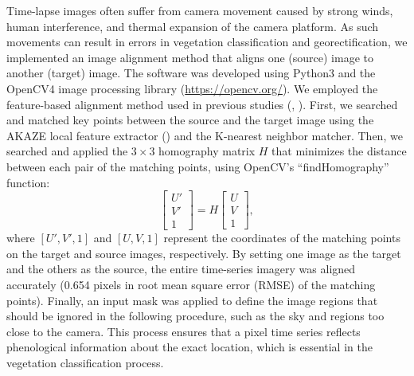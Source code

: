 \documentclass{article}
\begin{document}
Time-lapse images often suffer from camera movement caused by strong winds, human interference, and thermal expansion of the camera platform. As such movements can result in errors in vegetation classification and georectification, we implemented an image alignment method that aligns one (source) image to another (target) image. The software was developed using Python3 and the OpenCV4 image processing library (\url{https://opencv.org/}). We employed the feature-based alignment method used in previous studies (\cite{Hulton2020PyTrx}, \cite{Portenier2020Cryosphere}). First, we searched and matched key points between the source and the target image using the AKAZE local feature extractor (\cite{Alcantarilla2013AKAZE}) and the K-nearest neighbor matcher. Then, we searched and applied the \(3 \times 3\) homography matrix \(H\) that minimizes the distance between each pair of the matching points, using OpenCV's ``findHomography'' function:
\begin{equation}
\label{homography}
  \begin{bmatrix} 
    U' \\ V' \\ 1
  \end{bmatrix}
  =
  H
  \begin{bmatrix}
    U \\ V \\ 1
  \end{bmatrix},
\end{equation}
where \([U', V', 1]\) and \([U, V, 1]\) represent the coordinates of the matching points on the target and source images, respectively. By setting one image as the target and the others as the source, the entire time-series imagery was aligned accurately (0.654 pixels in root mean square error (RMSE) of the matching points). Finally, an input mask was applied to define the image regions that should be ignored in the following procedure, such as the sky and regions too close to the camera. This process ensures that a pixel time series reflects phenological information about the exact location, which is essential in the vegetation classification process.
\end{document}
